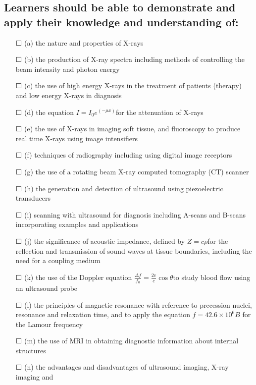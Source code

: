 \subsection*{Learners should be able to demonstrate and apply their knowledge and
	understanding of:
}
\begin{itemize}
	\item[\Large{$\Square$}](a) the nature and properties of X-rays
	\item[\Large{$\Square$}](b) the production of X-ray spectra including methods of controlling the beam
	intensity and photon energy
	\item[\Large{$\Square$}](c) the use of high energy X-rays in the treatment of patients (therapy) and low
	energy X-rays in diagnosis
	\item[\Large{$\Square$}](d) the equation \( I=I_{0}e^{(-\mu x)} \)for the attenuation of X-rays
	\item[\Large{$\Square$}](e) the use of X-rays in imaging soft tissue, and fluoroscopy to produce real time X-rays using image intensifiers
	\item[\Large{$\Square$}](f) techniques of radiography including using digital image receptors
	\item[\Large{$\Square$}](g) the use of a rotating beam X-ray computed tomography (CT) scanner
	\item[\Large{$\Square$}](h) the generation and detection of ultrasound using piezoelectric transducers
	\item[\Large{$\Square$}](i) scanning with ultrasound for diagnosis including A-scans and
	B-scans incorporating examples and applications
	\item[\Large{$\Square$}](j) the significance of acoustic impedance, defined by \(Z= c \rho \)for the reflection and transmission of sound waves at tissue boundaries, including the need for
	a coupling medium
	\item[\Large{$\Square$}](k) the use of the Doppler equation \( \frac{\Delta f}{f_{0}}=\frac{2v}{c}\cos \theta \)to study blood flow using an ultrasound probe
	\item[\Large{$\Square$}](l) the principles of magnetic resonance with reference to precession nuclei,
	resonance and relaxation time, and to apply the equation \(f=42.6 \times 10^{6}B \) for the Lamour frequency
	\item[\Large{$\Square$}](m) the use of MRI in obtaining diagnostic information about internal structures
	\item[\Large{$\Square$}](n) the advantages and disadvantages of ultrasound imaging, X-ray imaging and

\end{itemize}
